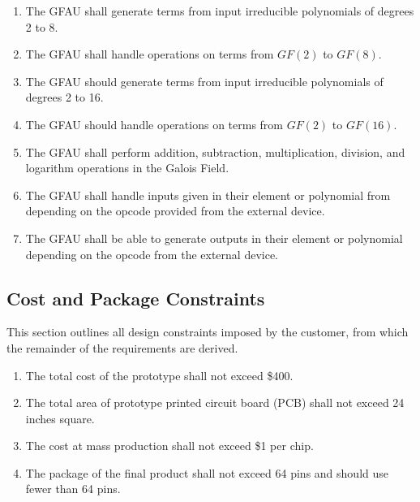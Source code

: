 \documentclass[12pt]{extarticle}
\begin{document}
        \begin{enumerate}

            \item The GFAU shall generate terms from input irreducible
            polynomials of degrees 2 to 8.

            \item The GFAU shall handle operations on terms from $GF(2)$ to
            $GF(8)$.

            \item The GFAU should generate terms from input irreducible
            polynomials of degrees 2 to 16.

            \item The GFAU should handle operations on terms from $GF(2)$ to
            $GF(16)$.

            \item The GFAU shall perform addition, subtraction, multiplication,
            division, and logarithm operations in the Galois Field.

            \item The GFAU shall handle inputs given in their element or
            polynomial from depending on the opcode provided from the external
            device.

            \item The GFAU shall be able to generate outputs in their element
            or polynomial depending on the opcode from the external device.


        \end{enumerate}

        \subsection{Cost and Package Constraints} This section outlines all
        design constraints imposed by the customer, from which the remainder of
        the requirements are derived.

        \begin{enumerate}

            \item The total cost of the prototype shall not exceed \$400.

            \item The total area of prototype printed circuit board (PCB) shall
            not exceed 24 inches square.

            \item The cost at mass production shall not exceed \$1 per chip.

            \item The package of the final product shall not exceed 64 pins and
            should use fewer than 64 pins.

        \end{enumerate}
\end{document}
